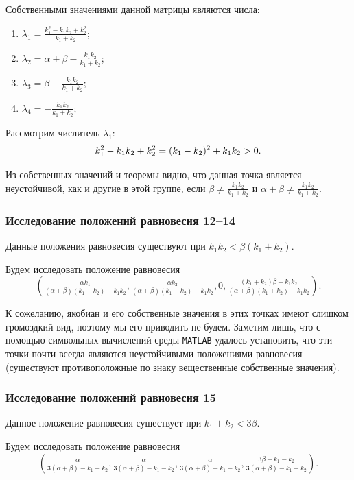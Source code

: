 \documentclass[12pt]{article}
\theoremstyle{rusdef}
\begin{document}
	Собственными значениями данной матрицы являются числа:
	\begin{enumerate}
		\item
		$\lambda_1 = \frac{k_1^2 - k_1 k_2 + k_2^2}{k_1+k_2}$;
		\item
		$\lambda_2 = \alpha + \beta - \frac{k_1 k_2}{k_1+k_2}$;
		\item
		$\lambda_3 = \beta - \frac{k_1 k_2}{k_1+k_2}$;
		\item
		$\lambda_4 = -\frac{k_1 k_2}{k_1+k_2}$;
	\end{enumerate}
	
	Рассмотрим числитель $\lambda_1$:
	\begin{gather}
	k_1^2 - k_1 k_2 + k_2^2 = (k_1 - k_2)^2 + k_1 k_2 > 0. \notag
	\end{gather}
	
	Из собственных значений и теоремы видно, что данная точка является неустойчивой, как и другие в этой группе, если $\beta \neq \tfrac{k_1k_2}{k_1+k_2}$ и $\alpha + \beta \neq \tfrac{k_1k_2}{k_1+k_2}$.
	
	\subsubsection{Исследование положений равновесия 12--14}

	Данные положения равновесия существуют при $k_1 k_2 < \beta(k_1 + k_2)$.

	Будем исследовать положение равновесия 
	$$
	\left( \tfrac{\alpha k_1}{(\alpha + \beta)(k_1 + k_2) - k_1 k_2}, \tfrac{\alpha k_2}{(\alpha + \beta)(k_1 + k_2) - k_1 k_2}, 0, \tfrac{(k_1 + k_2) \beta - k_1 k_2}{(\alpha + \beta)(k_1 + k_2) - k_1 k_2} \right).
	$$

	К сожеланию, якобиан и его собственные значения в этих точках имеют слишком громоздкий вид, поэтому мы его приводить не будем. Заметим лишь, что с помощью символьных вычислений среды \texttt{MATLAB} удалось установить, что эти точки почти всегда являются неустойчивыми положениями равновесия (существуют противоположные по знаку вещественные собственные значения).
	
	\subsubsection{Исследование положений равновесия 15}
	
	Данное положение равновесия существует при $k_1 + k_2 < 3\beta$.

	Будем исследовать положение равновесия 
	$$
	\left( \tfrac{\alpha}{3(\alpha + \beta) - k_1 - k_2}, \tfrac{\alpha}{3(\alpha + \beta) - k_1 - k_2}, \tfrac{\alpha}{3(\alpha + \beta) - k_1 - k_2}, \tfrac{3\beta - k_1 - k_2}{3(\alpha + \beta) - k_1 - k_2} \right).
	$$
\end{document}
